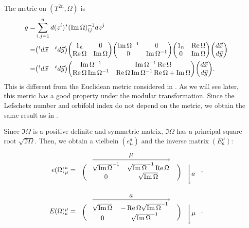 \documentclass[11pt]{article}
\newcommand{\Lef}{Lefschetz }
\begin{document}
The metric on $(T^{2n},\Omega)$ is
\begin{align}
    g=&  \sum_{i,j=1}^n  d (z^i)^\ast  (\Im \Omega)^{-1}_{ij} dz^j \nonumber \\
    =& \mqty({}^td\vec{x} & {}^t d\vec{y})\mqty( 1_n & 0 \\ \Re \Omega & \Im \Omega ) \mqty(\Im \Omega^{-1} & 0 \\ 0 & \Im \Omega^{-1}) \mqty( 1_n & \Re \Omega \\ 0 & \Im \Omega ) \mqty(d\vec{x}\\ d\vec{y}) \nonumber \\
    =&\mqty({}^td\vec{x} & {}^t d\vec{y})\mqty( \Im \Omega^{-1} & \Im \Omega^{-1} \Re \Omega \\ \Re \Omega   \Im \Omega^{-1} & \Re \Omega   \Im \Omega^{-1} \Re \Omega  + \Im \Omega ) \mqty(d\vec{x}\\ d\vec{y}) \label{eq:metric}.
\end{align}
This is different from the Euclidean metric considered in \cite{Kikuchi:2022lfv,Kikuchi:2022psj}. As we will see later, this metric has a good property under the modular transformation. Since the \Lef number and orbifold index do not depend on the metric, we obtain the same result as in \cite{Sakamoto:2020pev,Kobayashi:2022tti,Imai:2022bke,Kikuchi:2022lfv,Kikuchi:2022psj}.

Since $\Im \Omega$ is a positive definite and symmetric matrix, $\Im \Omega$ has a principal square root $\sqrt{\Im \Omega}$. Then, we obtain a vielbein $(e^a_{\mu})$ and the inverse matrix $(E^\mu_a)$:
\begin{align}
    e(\Omega)^a_{\mu}&=  \begin{array}{l cc rr}
 &   \multicolumn{2}{l}{ {\tikz \draw[->] (0,0)-- node[above]{$\mu$} (4,0);} } &&\\
\ldelim({2}{7pt}[] & \sqrt{\Im \Omega}^{-1} & \sqrt{\Im \Omega}^{-1} \Re \Omega & \rdelim){2}{7pt}[]  &\rdelim.{2}{14pt}[{\tikz \draw[<-] (0,0)-- node[right]{$a$} (0,1);}] \\ 
&0 & \sqrt{\Im \Omega}& &\\
&&&&
    \end{array}, \\
    E(\Omega)^\mu_a&= \begin{array}{l cc rr}
 &   \multicolumn{2}{l}{{\tikz \draw[->] (0,0)-- node[above]{$a$} (4,0);} } &&\\
\ldelim({2}{7pt}[] & \sqrt{\Im \Omega} &  -\Re \Omega \sqrt{\Im \Omega}^{-1} & \rdelim){2}{7pt}[]  &\rdelim.{2}{14pt}[{\tikz \draw[<-] (0,0)-- node[right]{$\mu$} (0,1);}] \\ 
&0 & \sqrt{\Im \Omega}^{-1}  & &\\
&&&&
    \end{array}.
\end{align}
\end{document}
